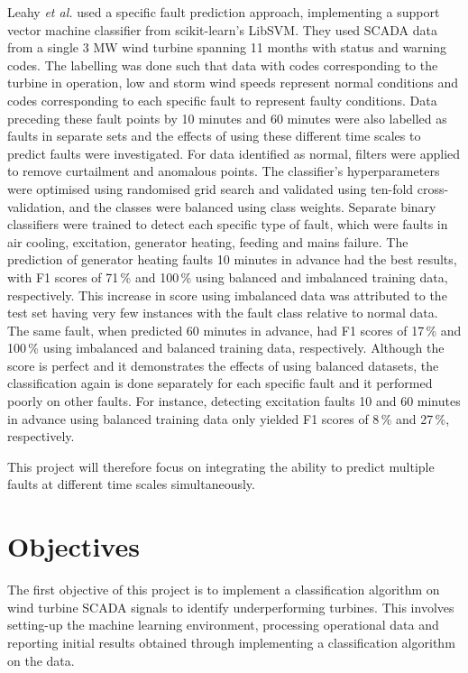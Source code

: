 Leahy \textit{et al.} \cite{Leahy16} used a specific fault prediction approach,
implementing a support vector machine classifier from scikit-learn's LibSVM.
They used SCADA data from a single 3 MW wind turbine spanning 11 months with
status and warning codes. The labelling was done such that data with codes
corresponding to the turbine in operation, low and storm wind speeds represent
normal conditions and codes corresponding to each specific fault to represent
faulty conditions. Data preceding these fault points by 10 minutes and 60
minutes were also labelled as faults in separate sets and the effects of using
these different time scales to predict faults were investigated. For data
identified as normal, filters were applied to remove curtailment and anomalous
points. The classifier's hyperparameters were optimised using randomised grid
search and validated using ten-fold cross-validation, and the classes were
balanced using class weights. Separate binary classifiers were trained to
detect each specific type of fault, which were faults in air cooling,
excitation, generator heating, feeding and mains failure. The prediction of
generator heating faults 10 minutes in advance had the best results, with F1
scores of 71\,\% and 100\,\% using balanced and imbalanced training data,
respectively. This increase in score using imbalanced data was attributed to
the test set having very few instances with the fault class relative to normal
data. The same fault, when predicted 60 minutes in advance, had F1 scores of
17\,\% and 100\,\% using imbalanced and balanced training data, respectively.
Although the score is perfect and it demonstrates the effects of using
balanced datasets, the classification again is done separately for each
specific fault and it performed poorly on other faults. For instance,
detecting excitation faults 10 and 60 minutes in advance using balanced
training data only yielded F1 scores of 8\,\% and 27\,\%, respectively.

This project will therefore focus on integrating the ability to predict
multiple faults at different time scales simultaneously.

\section{Objectives}

The first objective of this project is to implement a classification algorithm
on wind turbine SCADA signals to identify underperforming turbines. This
involves setting-up the machine learning environment, processing operational
data and reporting initial results obtained through implementing a
classification algorithm on the data.

